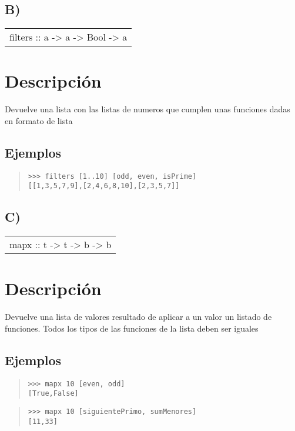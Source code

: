 \subsection{B)}
\begin{haddockdesc}
\item[\begin{tabular}{@{}l}
filters :: {\char 91}a{\char 93} -> {\char 91}a -> Bool{\char 93} -> {\char 91}{\char 91}a{\char 93}{\char 93}
\end{tabular}]
{\haddockbegindoc
\section*{Descripción}
Devuelve una lista con las listas de numeros que cumplen unas funciones dadas en formato de lista\par
\subsection*{Ejemplos}
\begin{quote}
{\haddockverb\begin{verbatim}
>>> filters [1..10] [odd, even, isPrime]
[[1,3,5,7,9],[2,4,6,8,10],[2,3,5,7]]

\end{verbatim}}
\end{quote}}
\end{haddockdesc}
\subsection{C)}
\begin{haddockdesc}
\item[\begin{tabular}{@{}l}
mapx :: t -> {\char 91}t -> b{\char 93} -> {\char 91}b{\char 93}
\end{tabular}]
{\haddockbegindoc
\section*{Descripción}
Devuelve una lista de valores resultado de aplicar a un valor un listado de funciones. Todos los tipos de las funciones de la lista deben ser iguales\par
\subsection*{Ejemplos}
\begin{quote}
{\haddockverb\begin{verbatim}
>>> mapx 10 [even, odd]
[True,False]

\end{verbatim}}
\end{quote}
\begin{quote}
{\haddockverb\begin{verbatim}
>>> mapx 10 [siguientePrimo, sumMenores]
[11,33]

\end{verbatim}}
\end{quote}}
\end{haddockdesc}